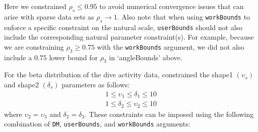 \documentclass[12pt]{article}\usepackage[]{graphicx}\usepackage[]{xcolor}
\begin{document}
Here we constrained $\rho_s \le 0.95$ to avoid numerical convergence issues that can arise with sparse data sets as $\rho_s \rightarrow 1$. Also note that when using \verb|workBounds| to enforce a specific constraint on the natural scale, \verb|userBounds| should not also include the corresponding natural parameter constraint(s). For example, because we are constraining $\rho_3 \ge 0.75$ with the \verb|workBounds| argument, we did not also include a $0.75$ lower bound for $\rho_3$ in `angleBounds' above.

For the beta distribution of the dive activity data, \cite{McClintockEtAl2013c} constrained the shape1 $(\upsilon_s)$ and shape2 $(\delta_s)$ parameters as follows:
\begin{eqnarray*}
1 \le \upsilon_1 \le \delta_1 \le 10 \\
1 \le \delta_2 \le \upsilon_2 \le 10
\end{eqnarray*}
where $\upsilon_2=\upsilon_3$ and $\delta_2=\delta_3$. These constraints can be imposed using the following combination of \verb|DM|, \verb|userBounds|, and \verb|workBounds| arguments:
\end{document}
